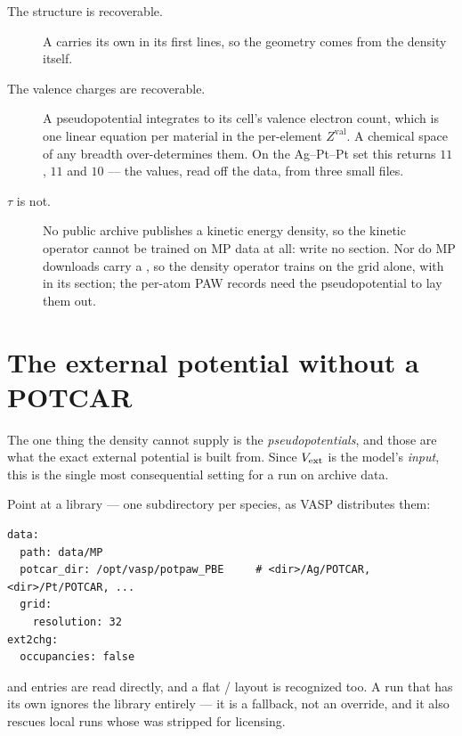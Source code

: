 \begin{description}
  \item[The structure is recoverable.] A  carries its own
     in its first lines, so the geometry comes from the density
    itself.
  \item[The valence charges are recoverable.] A pseudopotential 
    integrates to its cell's valence electron count, which is one linear
    equation per material in the per-element $Z^{\mathrm{val}}$. A chemical
    space of any breadth over-determines them. On the Ag--Pt--Pt set this
    returns $11$, $11$ and $10$ --- the  values, read off the
    data, from three small files.
  \item[$\tau$ is not.] No public archive publishes a kinetic energy density,
    so the kinetic operator cannot be trained on MP data at all: write no
     section. Nor do MP downloads carry a , so the
    density operator trains on the grid alone, with 
    in its  section; the per-atom PAW records need the
    pseudopotential to lay them out.
\end{description}

\section{The external potential without a POTCAR}
\label{sec:mp-potcar-dir}

The one thing the density cannot supply is the \emph{pseudopotentials}, and
those are what the exact external potential is built from. Since $V_{\mathrm{ext}}$ is the
model's \emph{input}, this is the single most consequential setting for a run
on archive data.

Point  at a  library --- one subdirectory
per species, as VASP distributes them:

\begin{lstlisting}
data:
  path: data/MP
  potcar_dir: /opt/vasp/potpaw_PBE     # <dir>/Ag/POTCAR, <dir>/Pt/POTCAR, ...
  grid:
    resolution: 32
ext2chg:
  occupancies: false
\end{lstlisting}

 and  entries are read directly, and a flat
 /  layout is recognized too. A run that has
its own  ignores the library entirely --- it is a fallback, not an
override, and it also rescues local runs whose  was stripped for
licensing.

